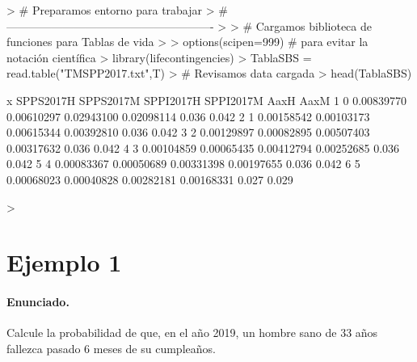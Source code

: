 \documentclass[12pt]{report}
\begin{document}
\begin{Schunk}
\begin{Sinput}
> # Preparamos entorno para trabajar 
> #-------------------------------------------------------
> 
> # Cargamos biblioteca de funciones para Tablas de vida
> 
> options(scipen=999) # para evitar la notación científica
> library(lifecontingencies)
> TablaSBS = read.table("TMSPP2017.txt",T)
> # Revisamos data cargada
> head(TablaSBS)
\end{Sinput}
\begin{Soutput}
  x  SPPS2017H  SPPS2017M  SPPI2017H  SPPI2017M  AaxH  AaxM
1 0 0.00839770 0.00610297 0.02943100 0.02098114 0.036 0.042
2 1 0.00158542 0.00103173 0.00615344 0.00392810 0.036 0.042
3 2 0.00129897 0.00082895 0.00507403 0.00317632 0.036 0.042
4 3 0.00104859 0.00065435 0.00412794 0.00252685 0.036 0.042
5 4 0.00083367 0.00050689 0.00331398 0.00197655 0.036 0.042
6 5 0.00068023 0.00040828 0.00282181 0.00168331 0.027 0.029
\end{Soutput}
\begin{Sinput}
> 
\end{Sinput}
\end{Schunk}



\section{Ejemplo 1}
\paragraph{Enunciado.}
Calcule la probabilidad de que, en el año 2019, un hombre sano
de 33 años fallezca pasado 6 meses de su cumpleaños.
\end{document}
